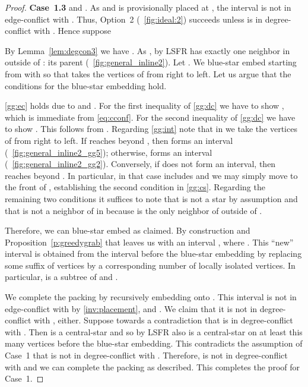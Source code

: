 \documentclass[11pt,a4paper,colorlinks=true,urlcolor=blue,citecolor=red]{article}
\theoremstyle{plain}
\newcommand{\case}[1]{\par\vspace{.5\baselineskip}\noindent\textbf{\sffamily Case~#1}}
\begin{document}
\begin{proof}
  \case{1.3}  and . As
   and  is provisionally placed at
  , the interval 
  is not in edge-conflict with .
  Thus, Option~2 (\figurename~\ref{fig:ideal:2}) succeeds unless
   is in degree-conflict with . Hence suppose



  By Lemma~\ref{lem:degcon3} we have . As , by LSFR  has exactly one neighbor in 
  outside of : its parent 
  (\figurename~\ref{fig:general_inline2}). Let
  . We blue-star embed  starting from 
  with  so that  takes the
  vertices of  from right to left. Let us argue that the
  conditions for the blue-star embedding hold.

  \ref{gg:ec} holds due to  and
  . For the first inequality of
  \ref{gg:dc} we have to show , which is
  immediate from \eqref{eq:cconf}. For the second inequality of
  \ref{gg:dc} we have to show . This follows
  from
  . Regarding
  \ref{gg:int} note that in  we take the vertices of
   from right to left. If  reaches beyond
  , then  forms an interval
  (\figurename~\ref{fig:general_inline2_gg5}); otherwise,
   forms an interval
  (\figurename~\ref{fig:general_inline2_gg2}).  Conversely, if
   does not form an interval, then 
  reaches beyond . In particular, in that case 
  includes  and we may simply move  to the front
  of , establishing the second condition in
  \ref{gg:cs}. Regarding the remaining two conditions it suffices to
  note that  is not a star by assumption and that  is not
  a neighbor of  in  because  is the only neighbor of 
  outside of .

  Therefore, we can blue-star embed  as claimed. By construction and
  Proposition~\ref{p:greedygrab} that leaves us with an interval
  , where . This ``new'' interval is obtained from the
  interval  before the blue-star embedding by replacing some suffix of vertices by a corresponding number of
  locally isolated vertices. In particular,  is a
  subtree of  and
  .

  We complete the packing by recursively embedding  onto
  . This interval is not in edge-conflict with  by
  \ref{inv:placement},  and
  . We claim that it is not in
  degree-conflict with , either. Suppose towards a contradiction
  that  is in degree-conflict with . Then
   is a central-star and so by LSFR also
   is a central-star on at least this many
  vertices before the blue-star embedding. This contradicts the
  assumption of Case~1 that  is not in degree-conflict with
  . Therefore,  is not in degree-conflict with  and
  we can complete the packing as described. This completes the proof for
  Case~1.


\end{proof}
\end{document}
